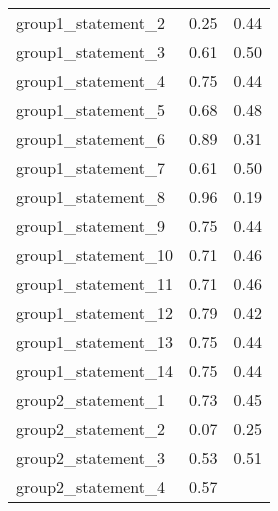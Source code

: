 \documentclass{article}
\begin{document}
\begin{table}[!h]
\begin{tabular}{lll}
\cline{1-3}
\multicolumn{1}{|l}{group1\_statement\_2} &
  \multicolumn{1}{|l}{0.25} &
  \multicolumn{1}{|l|}{0.44} \\
\cline{1-3}
\multicolumn{1}{|l}{group1\_statement\_3} &
  \multicolumn{1}{|l}{0.61} &
  \multicolumn{1}{|l|}{0.50} \\
\cline{1-3}
\multicolumn{1}{|l}{group1\_statement\_4} &
  \multicolumn{1}{|l}{0.75} &
  \multicolumn{1}{|l|}{0.44} \\
\cline{1-3}
\multicolumn{1}{|l}{group1\_statement\_5} &
  \multicolumn{1}{|l}{0.68} &
  \multicolumn{1}{|l|}{0.48} \\
\cline{1-3}
\multicolumn{1}{|l}{group1\_statement\_6} &
  \multicolumn{1}{|l}{0.89} &
  \multicolumn{1}{|l|}{0.31} \\
\cline{1-3}
\multicolumn{1}{|l}{group1\_statement\_7} &
  \multicolumn{1}{|l}{0.61} &
  \multicolumn{1}{|l|}{0.50} \\
\cline{1-3}
\multicolumn{1}{|l}{group1\_statement\_8} &
  \multicolumn{1}{|l}{0.96} &
  \multicolumn{1}{|l|}{0.19} \\
\cline{1-3}
\multicolumn{1}{|l}{group1\_statement\_9} &
  \multicolumn{1}{|l}{0.75} &
  \multicolumn{1}{|l|}{0.44} \\
\cline{1-3}
\multicolumn{1}{|l}{group1\_statement\_10} &
  \multicolumn{1}{|l}{0.71} &
  \multicolumn{1}{|l|}{0.46} \\
\cline{1-3}
\multicolumn{1}{|l}{group1\_statement\_11} &
  \multicolumn{1}{|l}{0.71} &
  \multicolumn{1}{|l|}{0.46} \\
\cline{1-3}
\multicolumn{1}{|l}{group1\_statement\_12} &
  \multicolumn{1}{|l}{0.79} &
  \multicolumn{1}{|l|}{0.42} \\
\cline{1-3}
\multicolumn{1}{|l}{group1\_statement\_13} &
  \multicolumn{1}{|l}{0.75} &
  \multicolumn{1}{|l|}{0.44} \\
\cline{1-3}
\multicolumn{1}{|l}{group1\_statement\_14} &
  \multicolumn{1}{|l}{0.75} &
  \multicolumn{1}{|l|}{0.44} \\
\cline{1-3}
\multicolumn{1}{|l}{group2\_statement\_1} &
  \multicolumn{1}{|l}{0.73} &
  \multicolumn{1}{|l|}{0.45} \\
\cline{1-3}
\multicolumn{1}{|l}{group2\_statement\_2} &
  \multicolumn{1}{|l}{0.07} &
  \multicolumn{1}{|l|}{0.25} \\
\cline{1-3}
\multicolumn{1}{|l}{group2\_statement\_3} &
  \multicolumn{1}{|l}{0.53} &
  \multicolumn{1}{|l|}{0.51} \\
\cline{1-3}
\multicolumn{1}{|l}{group2\_statement\_4} &
  \multicolumn{1}{|l}{0.57} &

\end{tabular}
\end{table}
\end{document}
